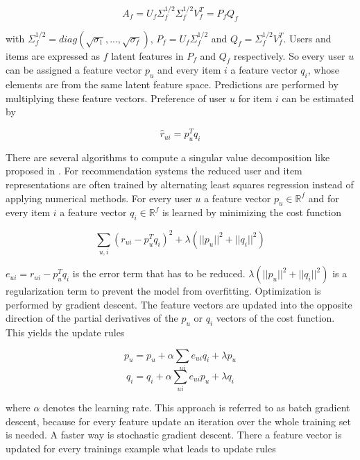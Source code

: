 \documentclass[10pt]{reportMaster}
\begin{document}
\begin{equation}
	A_f = U_f \Sigma_f^{1/2} \Sigma_f^{1/2} V_f^T = P_f Q_f
\end{equation}

with $\Sigma_f^{1/2} = diag(\sqrt{\sigma_1}, ..., \sqrt{\sigma_f})$, $P_f = U_f \Sigma_f^{1/2}$ and $Q_f = \Sigma_f^{1/2} V_f^T$.
Users and items are expressed as $f$ latent features in $P_f$ and $Q_f$ respectively.
So every user $u$ can be assigned a feature vector $p_u$ and every item $i$ a feature vector $q_i$, whose elements are from the same latent feature space.
Predictions are performed by multiplying these feature vectors.
Preference of user $u$ for item $i$ can be estimated by 

\begin{equation}
	\hat{r}_{ui} = p_u^T q_i
\end{equation}


There are several algorithms to compute a singular value decomposition like proposed in \cite{svdGolubSolution}.
For recommendation systems the reduced user and item representations are often trained by alternating least squares regression instead of applying numerical methods. %
For every user $u$ a feature vector $p_u \in \mathds{R}^f$ and for every item $i$ a feature vector $q_i \in \mathds{R}^f$ is learned by minimizing the cost function 

\begin{equation}
	\sum_{u, i}{(r_{ui} - p_u^T q_i)^2 + \lambda (||p_u||^2 + ||q_i||^2)}
\end{equation}

$e_{ui} = r_{ui} - p_u^T q_i$ is the error term that has to be reduced.
$\lambda (||p_u||^2 + ||q_i||^2)$ is a regularization term to prevent the model from overfitting.
Optimization is performed by gradient descent.
The feature vectors are updated into the opposite direction of the partial derivatives of the $p_u$ or $q_i$ vectors of the cost function.
This yields the update rules

\begin{equation}
	p_u = p_u + \alpha \sum_{ui}{e_{ui} q_i + \lambda p_u}
\end{equation}
\begin{equation}
	q_i = q_i + \alpha \sum_{ui}{e_{ui} p_u + \lambda q_i}
\end{equation}

where $\alpha$ denotes the learning rate.
This approach is referred to as batch gradient descent, because for every feature update an iteration over the whole training set is needed.
A faster way is stochastic gradient descent. %
There a feature vector is updated for every trainings example what leads to update rules 
\end{document}
